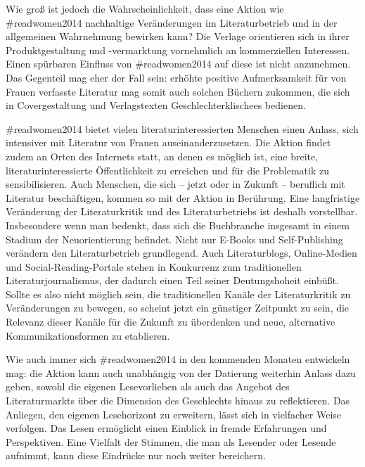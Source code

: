 \documentclass[a4paper,
fontsize=11pt,
oneside,
numbers=noperiodatend,
parskip=half-,
bibliography=totoc,
final
]{scrartcl}
\begin{document}
Wie groß ist jedoch die Wahrscheinlichkeit, dass eine Aktion wie
\#readwomen2014 nachhaltige Veränderungen im Literaturbetrieb und in der
allgemeinen Wahrnehmung bewirken kann? Die Verlage orientieren sich in
ihrer Produktgestaltung und -vermarktung vornehmlich an kommerziellen
Interessen. Einen spürbaren Einfluss von \#readwomen2014 auf diese ist
nicht anzunehmen. Das Gegenteil mag eher der Fall sein: erhöhte positive
Aufmerksamkeit für von Frauen verfasste Literatur mag somit auch solchen
Büchern zukommen, die sich in Covergestaltung und Verlagstexten
Geschlechterklischees bedienen.

\#readwomen2014 bietet vielen literaturinteressierten Menschen einen
Anlass, sich intensiver mit Literatur von Frauen auseinanderzusetzen.
Die Aktion findet zudem an Orten des Internets statt, an denen es
möglich ist, eine breite, literaturinteressierte Öffentlichkeit zu
erreichen und für die Problematik zu sensibilisieren. Auch Menschen, die
sich -- jetzt oder in Zukunft -- beruflich mit Literatur beschäftigen,
kommen so mit der Aktion in Berührung. Eine langfristige Veränderung der
Literaturkritik und des Literaturbetriebs ist deshalb vorstellbar.
Insbesondere wenn man bedenkt, dass sich die Buchbranche insgesamt in
einem Stadium der Neuorientierung befindet. Nicht nur E-Books und
Self-Publishing verändern den Literaturbetrieb grundlegend. Auch
Literaturblogs, Online-Medien und Social-Reading-Portale stehen in
Konkurrenz zum traditionellen Literaturjournalismus, der dadurch einen
Teil seiner Deutungshoheit einbüßt. Sollte es also nicht möglich sein,
die traditionellen Kanäle der Literaturkritik zu Veränderungen zu
bewegen, so scheint jetzt ein günstiger Zeitpunkt zu sein, die Relevanz
dieser Kanäle für die Zukunft zu überdenken und neue, alternative
Kommunikationsformen zu etablieren.

Wie auch immer sich \#readwomen2014 in den kommenden Monaten entwickeln
mag: die Aktion kann auch unabhängig von der Datierung weiterhin Anlass
dazu geben, sowohl die eigenen Lesevorlieben als auch das Angebot des
Literaturmarkts über die Dimension des Geschlechts hinaus zu
reflektieren. Das Anliegen, den eigenen Lesehorizont zu erweitern, lässt
sich in vielfacher Weise verfolgen. Das Lesen ermöglicht einen Einblick
in fremde Erfahrungen und Perspektiven. Eine Vielfalt der Stimmen, die
man als Lesender oder Lesende aufnimmt, kann diese Eindrücke nur noch
weiter bereichern.~

\end{document}
